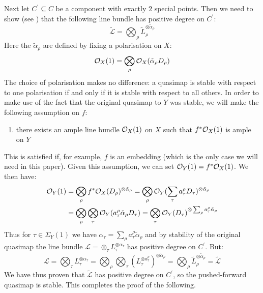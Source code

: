Next let $C^\prime \subseteq C$ be a component with exactly $2$ special points. Then we need to show (see \cite[Definition 3.1.1]{CF-K}) that the following line bundle has positive degree on $C^\prime$:
\begin{equation*} \tilde{\mathcal{L}} = \bigotimes_\rho \tilde{L}_\rho^{\otimes \tilde{\alpha}_\rho} \end{equation*}
Here the $\tilde{\alpha}_\rho$ are defined by fixing a polarisation on $X$:
\begin{equation*} \mathcal{O}_X(1) = \bigotimes_\rho \mathcal{O}_X(\tilde{\alpha}_\rho D_\rho) \end{equation*}
The choice of polarisation makes no difference: a quasimap is stable with respect to one polarisation if and only if it is stable with respect to all others. In order to make use of the fact that the original quasimap to $Y$ was stable, we will make the following assumption on $f$:
\begin{enumerate}
\item there exists an ample line bundle $\mathcal{O}_X(1)$ on $X$ such that $f^*\mathcal{O}_X(1)$ is ample on $Y$
\end{enumerate}
This is satisfied if, for example, $f$ is an embedding (which is the only case we will need in this paper). Given this assumption, we can set $\mathcal{O}_Y(1) = f^*\mathcal{O}_X(1)$. We then have:
\begin{align*} \mathcal{O}_Y(1) & = \bigotimes_\rho f^*\mathcal{O}_X(D_\rho)^{\otimes \tilde{\alpha}_\rho} = \bigotimes_\rho \mathcal{O}_Y (\sum_\tau a_\tau^\rho D_\tau)^{\otimes \tilde{\alpha}_\rho} \\
& = \bigotimes_\rho \bigotimes_\tau \mathcal{O}_Y(a_\tau^\rho \tilde{\alpha}_\rho D_\tau) = \bigotimes_\tau \mathcal{O}_Y(D_\tau)^{\otimes \sum_\rho a_\tau^\rho \tilde{\alpha}_\rho}\end{align*}
Thus for $\tau \in \Sigma_Y(1)$ we have $\alpha_\tau = \sum_\rho a_\tau^\rho \tilde{\alpha}_\rho$ and by stability of the original quasimap the line bundle $\mathcal{L} = \otimes_\tau L_\tau^{\otimes \alpha_\tau}$ has positive degree on $C^\prime$. But:
\begin{equation*} \mathcal{L} = \bigotimes_\tau L_\tau^{\otimes \alpha_\tau} = \bigotimes_\rho \bigotimes_\tau \left( L_\tau^{\otimes a_\tau^\rho} \right)^{\otimes \tilde{\alpha}_\rho} = \bigotimes_\rho \tilde{L}_\rho^{\otimes \tilde{\alpha}_\rho} = \tilde{\mathcal{L}} \end{equation*}
We have thus proven that $\tilde{\mathcal{L}}$ has positive degree on $C^\prime$, so the pushed-forward quasimap is stable. This completes the proof of the following.

